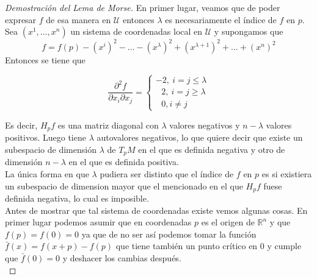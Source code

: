 \begin{proof}[Demostración del Lema de Morse]
    En primer lugar, veamos que de poder expresar $f$ de esa manera en $\mathcal{U}$ entonces $\lambda$ es necesariamente el índice de $f$ en $p$. Sea $(x^1,\dots, x^n)$ un sistema de coordenadas local en $\mathcal{U}$ y supongamos que
    \begin{equation*}
        f=f(p)-(x^i)^2-\dots-(x^\lambda)^2 + (x^{\lambda +1})^2+\dots + (x^n)^2
    \end{equation*}
    Entonces se tiene que 

    \[
        \frac{\partial^2 f}{\partial x_i \partial x_j}=
        \begin{cases}
            -2, ~i=j\le \lambda\\
            ~~~2, ~i=j\ge \lambda\\
            ~~~0, i\neq j
        \end{cases}
    \]

    Es decir, $H_pf$ es una matriz diagonal con $\lambda$ valores negativos y $n-\lambda$ valores positivos. Luego tiene $\lambda$ autovalores negativos, lo que quiere decir que existe un subespacio de dimensión $\lambda$ de $T_pM$ en el que es definida negativa y otro de dimensión $n-\lambda$ en el que es definida positiva.\\

    La única forma en que $\lambda$ pudiera ser distinto que el índice de $f$ en $p$ es si existiera un subespacio de dimension mayor que el mencionado en el que $H_pf$ fuese definida negativa, lo cual es imposible.\\

    Antes de mostrar que tal sistema de coordenadas existe vemos algunas cosas. En primer lugar podemos asumir que en coordenadas $p$ es el origen de $\mathbb{R}^n$ y que $f(p)=f(0)=0$ ya que de no ser así podemos tomar la función $\bar{f}(x)=f(x+p)-f(p)$ que tiene también un punto crítico en $0$ y cumple que $\bar{f}(0)=0$ y deshacer los cambias después.\\


\end{proof}
